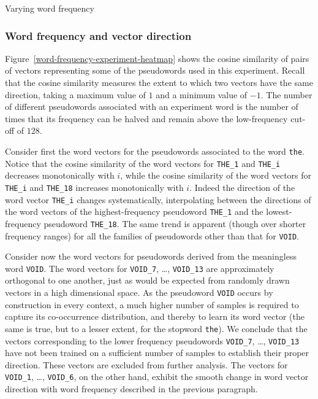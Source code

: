 \documentclass{article} %
\newcommand{\word}[1]{\texttt{#1}}
\begin{document}
\begin{section}{Varying word frequency}
\subsubsection{Word frequency and vector direction}\label{WFVE-direction}
Figure~\ref{word-frequency-experiment-heatmap} shows the cosine
similarity of pairs of vectors representing some of the pseudowords used in
this experiment.  Recall that the cosine similarity measures the extent
to which two vectors have the same direction, taking a maximum value of
$1$ and a minimum value of $-1$.  The number of different pseudowords
associated with an experiment word is the number of times that its
frequency can be halved and remain above the low-frequency cut-off of
$128$.

Consider first the word vectors for the pseudowords associated to the word
\word{the}.  Notice that the cosine similarity of the word vectors for
\word{THE\_1} and \word{THE\_i} decreases monotonically with $i$, while the
cosine similarity of the word vectors for \word{THE\_i} and \word{THE\_18}
increases monotonically with $i$.  Indeed the direction of
the word vector \word{THE\_i} changes systematically, interpolating between the
directions of the word vectors of the highest-frequency pseudoword
\word{THE\_1} and the lowest-frequency pseudoword \word{THE\_18}.  The same
trend is apparent (though over shorter frequency ranges) for all the families of pseudowords
other than that for \word{VOID}.

Consider now the word vectors for pseudowords derived from the meaningless word
\word{VOID}.  The word vectors for \word{VOID\_7}, \dots, \word{VOID\_13}
are approximately orthogonal to one another, just as would be expected from
randomly drawn vectors in a high dimensional space.
As the pseudoword \word{VOID} occurs by
construction in every context, a much higher number of samples is
required to capture its co-occurrence distribution, and
thereby to learn its word vector (the same is true, but to a lesser
extent, for the stopword \word{the}).
We conclude that the vectors corresponding to the lower frequency
pseudowords \word{VOID\_7}, \dots, \word{VOID\_13} have not been trained on a
sufficient number of samples to establish their proper direction.
These vectors are excluded from further analysis.
The vectors for \word{VOID\_1}, \dots, \word{VOID\_6}, on the other hand,
exhibit the smooth change in word vector direction with word frequency described in
the previous paragraph.


\end{section}
\end{document}
